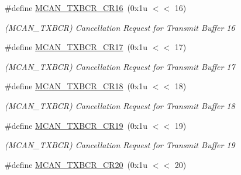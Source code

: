 \begin{DoxyCompactItemize}
\mbox{\label{group__SAMV71__MCAN_ga8622b5906ea03e3a4d75a272ea7f2ea9}} 
\#define \mbox{\hyperlink{group__SAMV71__MCAN_ga8622b5906ea03e3a4d75a272ea7f2ea9}{M\+C\+A\+N\+\_\+\+T\+X\+B\+C\+R\+\_\+\+C\+R16}}~(0x1u $<$$<$ 16)
\begin{DoxyCompactList}\small\item\em (M\+C\+A\+N\+\_\+\+T\+X\+B\+CR) Cancellation Request for Transmit Buffer 16 \end{DoxyCompactList}\item 
\mbox{\label{group__SAMV71__MCAN_ga4014ab6d38e25a3b0110754f1277c3df}} 
\#define \mbox{\hyperlink{group__SAMV71__MCAN_ga4014ab6d38e25a3b0110754f1277c3df}{M\+C\+A\+N\+\_\+\+T\+X\+B\+C\+R\+\_\+\+C\+R17}}~(0x1u $<$$<$ 17)
\begin{DoxyCompactList}\small\item\em (M\+C\+A\+N\+\_\+\+T\+X\+B\+CR) Cancellation Request for Transmit Buffer 17 \end{DoxyCompactList}\item 
\mbox{\label{group__SAMV71__MCAN_ga5a7f44680d2b1db62d45ba08ab6a8c69}} 
\#define \mbox{\hyperlink{group__SAMV71__MCAN_ga5a7f44680d2b1db62d45ba08ab6a8c69}{M\+C\+A\+N\+\_\+\+T\+X\+B\+C\+R\+\_\+\+C\+R18}}~(0x1u $<$$<$ 18)
\begin{DoxyCompactList}\small\item\em (M\+C\+A\+N\+\_\+\+T\+X\+B\+CR) Cancellation Request for Transmit Buffer 18 \end{DoxyCompactList}\item 
\mbox{\label{group__SAMV71__MCAN_gaa9b6541f9c09ef574d52fcc5347d53d3}} 
\#define \mbox{\hyperlink{group__SAMV71__MCAN_gaa9b6541f9c09ef574d52fcc5347d53d3}{M\+C\+A\+N\+\_\+\+T\+X\+B\+C\+R\+\_\+\+C\+R19}}~(0x1u $<$$<$ 19)
\begin{DoxyCompactList}\small\item\em (M\+C\+A\+N\+\_\+\+T\+X\+B\+CR) Cancellation Request for Transmit Buffer 19 \end{DoxyCompactList}\item 
\mbox{\label{group__SAMV71__MCAN_gaf7d1742b93cf103c20d51e4c65475c18}} 
\#define \mbox{\hyperlink{group__SAMV71__MCAN_gaf7d1742b93cf103c20d51e4c65475c18}{M\+C\+A\+N\+\_\+\+T\+X\+B\+C\+R\+\_\+\+C\+R20}}~(0x1u $<$$<$ 20)
$$
\end{DoxyCompactItemize}
